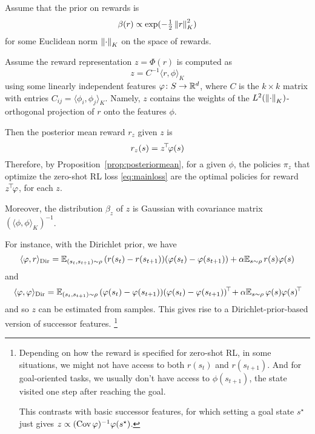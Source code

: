 \documentclass[11pt,a4paper]{article}
\newcommand{\Dir}{_\mathrm{Dir}}
\begin{document}
\begin{prop}
\label{prop:gaussianprior}
Assume that the prior on rewards is
\begin{equation}
\beta(r)\propto \exp(-\tfrac12 \left\lVert r\right\rVert^2_K)
\end{equation}
for some Euclidean norm $\left\lVert\cdot\right\rVert_K$ on the space of rewards.

Assume the reward representation $z=\Phi(r)$ is computed as
\begin{equation}
\label{eq:genSF}
z=C^{-1}  \langle r,\phi\rangle_K
\end{equation}
using some linearly independent features $\varphi\colon S \to {\mathbb{R}}^d$,
where $C$ is the $k\times k$ matrix with entries $C_{ij}=\langle
\phi_i,\phi_j\rangle_K$. Namely, $z$ contains the weights of
the $L^2(\left\lVert\cdot\right\rVert_K)$-orthogonal projection of $r$ onto the features
$\phi$.

Then the posterior mean 
reward $r_z$ given $z$ is
\begin{equation}
\label{eq:rzD}
r_z(s)=z^{\!\top}\!\varphi(s)
\end{equation}
Therefore, by Proposition~\ref{prop:posteriormean}, for a given $\phi$,
the policies $\pi_z$ that optimize the zero-shot RL loss
\eqref{eq:mainloss} are the optimal policies for reward $z^{\!\top}\!\varphi$,
for each $z$.

Moreover, the distribution $\beta_z$ of $z$ is Gaussian with
covariance matrix $(\langle \phi,\phi\rangle_K)^{-1}$.
\end{prop}

For instance, with the Dirichlet prior, we have
\begin{equation}
\langle\phi ,r\rangle\Dir = \E_{(s_t,s_{t+1})\sim \rho}\,
(r(s_t)-r(s_{t+1}))(\phi(s_t)-\phi(s_{t+1}))+ \alpha \E_{s\sim\rho}\,
r(s)\phi(s)
\end{equation}
and
\begin{equation}
\langle \phi , \phi\rangle\Dir= \E_{(s_t,s_{t+1})\sim
\rho}\,(\phi(s_t)-\phi(s_{t+1}))\transp{(\phi(s_t)-\phi(s_{t+1}))}
+\alpha\E_{s\sim \rho}\, \phi(s)\transp{\phi(s)}
\end{equation}
and so $z$ can be estimated from
samples. This gives rise to a Dirichlet-prior-based version of successor
features. \footnote{Depending on how the reward is specified for zero-shot
RL, in some situations, we might not have access to both
$r(s_t)$ and $r(s_{t+1})$. And for goal-oriented tasks, we usually don't have access
to $\phi(s_{t+1})$, the state visited one step after reaching the goal.

This contrasts with basic successor features, for which setting a goal
state
$s^\star$ just gives $z\propto (\operatorname{Cov} \varphi)^{-1} \varphi(s^\star)$.
}
\end{document}
